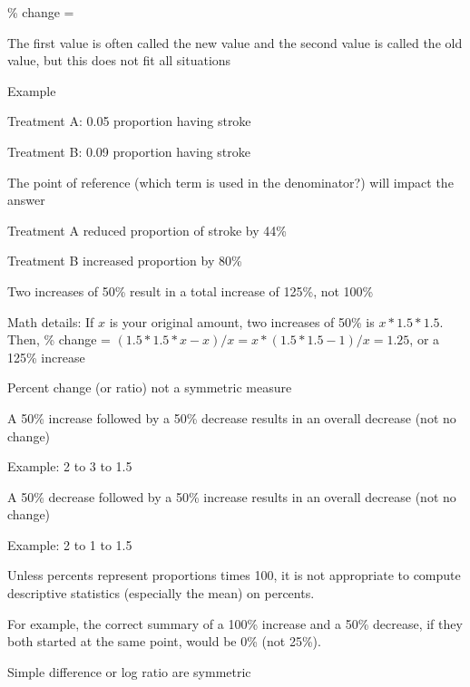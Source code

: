 \beq
 \% \textrm{ change } =  
\eeq
\item The first value is often called the new value and the second value is called the old value, but this does not fit all situations
\item   Example
  \bi
  \item      Treatment A: 0.05 proportion having stroke
  \item      Treatment B: 0.09 proportion having stroke
  \ei
\item The point of reference (which term is used in the denominator?) will impact the answer
  \bi
   \item      Treatment A reduced proportion of stroke by 44\%
   \item      Treatment B increased proportion by 80\%
  \ei
\item   Two increases of 50\% result in a total increase of 125\%, not
        100\%
  \bi
   \item Math details: If $x$ is your original amount, two increases of 50\% is $x*1.5*1.5$. Then, \% change = $(1.5*1.5* x - x) / x = x*(1.5*1.5 - 1) / x = 1.25$, or a 125\% increase
  \ei
\item   Percent change (or ratio) not a symmetric measure
  \bi
  \item A 50\% increase followed by a 50\% decrease results in an overall decrease (not no change)
   \bi
    \item Example: 2 to 3 to 1.5
   \ei
  \item A 50\% decrease followed by a 50\% increase results in an overall decrease (not no change)
   \bi
   \item Example: 2 to 1 to 1.5
   \ei
  \ei
\item Unless percents represent proportions times 100, it is not appropriate to compute descriptive statistics (especially the mean) on percents.
  \bi
    \item For example, the correct summary of a 100\% increase and a 50\% decrease, if they both started at the same point, would be 0\% (not 25\%).
  \ei
\item   Simple difference or log ratio are symmetric
\ei

